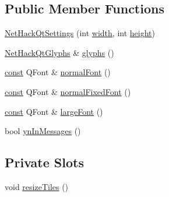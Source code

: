\subsection*{Public Member Functions}
\begin{DoxyCompactItemize}
\item 
\hyperlink{classNetHackQtSettings_ad76e4d2a5b5142e93fd4be01f75bff3f}{Net\+Hack\+Qt\+Settings} (int \hyperlink{xpm2img_8c_a2474a5474cbff19523a51eb1de01cda4}{width}, int \hyperlink{xpm2img_8c_ad12fc34ce789bce6c8a05d8a17138534}{height})
\item 
\hyperlink{classNetHackQtGlyphs}{Net\+Hack\+Qt\+Glyphs} \& \hyperlink{classNetHackQtSettings_a1b0a23abb1bd74737ec6640ab6fccac3}{glyphs} ()
\item 
\hyperlink{tradstdc_8h_a2c212835823e3c54a8ab6d95c652660e}{const} Q\+Font \& \hyperlink{classNetHackQtSettings_a53c8c39a6c92cde6376a67ae36ba9a7e}{normal\+Font} ()
\item 
\hyperlink{tradstdc_8h_a2c212835823e3c54a8ab6d95c652660e}{const} Q\+Font \& \hyperlink{classNetHackQtSettings_a55b98286c939a5e0abc18f8ab1f8b67d}{normal\+Fixed\+Font} ()
\item 
\hyperlink{tradstdc_8h_a2c212835823e3c54a8ab6d95c652660e}{const} Q\+Font \& \hyperlink{classNetHackQtSettings_a4310a79dd7cbdb8a905bb7365789290d}{large\+Font} ()
\item 
bool \hyperlink{classNetHackQtSettings_ac6b894c64a785b14f28ddf1b99d42493}{yn\+In\+Messages} ()
\end{DoxyCompactItemize}
\subsection*{Private Slots}
\begin{DoxyCompactItemize}
\item 
void \hyperlink{classNetHackQtSettings_ad0dbb9befaae42d3f63afbe1dce0a4fd}{resize\+Tiles} ()
\end{DoxyCompactItemize}
